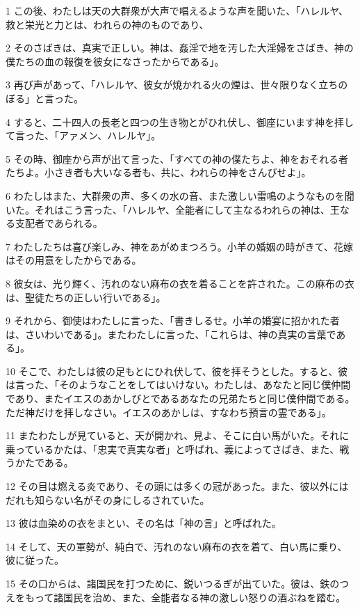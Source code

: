 \par 1 この後、わたしは天の大群衆が大声で唱えるような声を聞いた、「ハレルヤ、救と栄光と力とは、われらの神のものであり、
\par 2 そのさばきは、真実で正しい。神は、姦淫で地を汚した大淫婦をさばき、神の僕たちの血の報復を彼女になさったからである」。
\par 3 再び声があって、「ハレルヤ、彼女が焼かれる火の煙は、世々限りなく立ちのぼる」と言った。
\par 4 すると、二十四人の長老と四つの生き物とがひれ伏し、御座にいます神を拝して言った、「アァメン、ハレルヤ」。
\par 5 その時、御座から声が出て言った、「すべての神の僕たちよ、神をおそれる者たちよ。小さき者も大いなる者も、共に、われらの神をさんびせよ」。
\par 6 わたしはまた、大群衆の声、多くの水の音、また激しい雷鳴のようなものを聞いた。それはこう言った、「ハレルヤ、全能者にして主なるわれらの神は、王なる支配者であられる。
\par 7 わたしたちは喜び楽しみ、神をあがめまつろう。小羊の婚姻の時がきて、花嫁はその用意をしたからである。
\par 8 彼女は、光り輝く、汚れのない麻布の衣を着ることを許された。この麻布の衣は、聖徒たちの正しい行いである」。
\par 9 それから、御使はわたしに言った、「書きしるせ。小羊の婚宴に招かれた者は、さいわいである」。またわたしに言った、「これらは、神の真実の言葉である」。
\par 10 そこで、わたしは彼の足もとにひれ伏して、彼を拝そうとした。すると、彼は言った、「そのようなことをしてはいけない。わたしは、あなたと同じ僕仲間であり、またイエスのあかしびとであるあなたの兄弟たちと同じ僕仲間である。ただ神だけを拝しなさい。イエスのあかしは、すなわち預言の霊である」。
\par 11 またわたしが見ていると、天が開かれ、見よ、そこに白い馬がいた。それに乗っているかたは、「忠実で真実な者」と呼ばれ、義によってさばき、また、戦うかたである。
\par 12 その目は燃える炎であり、その頭には多くの冠があった。また、彼以外にはだれも知らない名がその身にしるされていた。
\par 13 彼は血染めの衣をまとい、その名は「神の言」と呼ばれた。
\par 14 そして、天の軍勢が、純白で、汚れのない麻布の衣を着て、白い馬に乗り、彼に従った。
\par 15 その口からは、諸国民を打つために、鋭いつるぎが出ていた。彼は、鉄のつえをもって諸国民を治め、また、全能者なる神の激しい怒りの酒ぶねを踏む。
